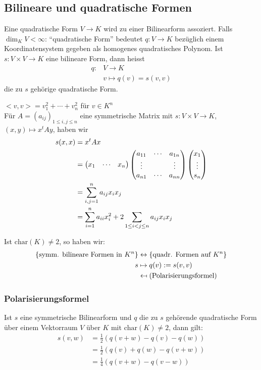 \subsection{Bilineare und quadratische Formen}
Eine quadratische Form $V\to K$ wird zu einer Bilinearform assoziert. Falls $\dim_KV<\infty$: ``quadratische Form'' bedeutet $q:V\to K$ bezüglich einem Koordinatensystem gegeben als homogenes quadratisches Polynom. Ist $s:V\times V\to K$ eine bilineare Form, dann heisst
\begin{align*}
  q:&V\to K\\
  &v \mapsto q(v)=s(v,v)
\end{align*}
die zu $s$ gehörige quadratische Form.
\begin{Bsp}
  $<v,v>=v_1^2+\cdots+v_n^2$ für $v\in K^n$\\
  Für $A=(a_{ij})_{1\leq i, j\leq n}$ eine symmetrische Matrix mit $s:V\times V\to K$, $(x,y)\mapsto x^tAy$, haben wir
  \begin{align*}
    s(x,x)&= x^tAx\\
    &= \begin{pmatrix}x_1&\cdots&x_n\end{pmatrix}\begin{pmatrix}a_{11}&\cdots&a_{1n}\\ \vdots&&\vdots\\ a_{n1}&\cdots&a_{nn}\end{pmatrix}\begin{pmatrix}x_1\\ \vdots \\ s_n\end{pmatrix}\\
    &= \sum^n_{i,j=1}a_{ij}x_ix_j\\
    &= \sum^n_{i=1}a_{ii}x_i^2+2\sum_{1\leq i<j\leq n}a_{ij}x_ix_j
  \end{align*}
\end{Bsp}
Ist $\text{char}(K)\neq 2$, so haben wir:
\begin{align*}
  \{\text{symm. bilineare Formen in $K^n$}\}&\leftrightarrow\{\text{quadr. Formen auf}\ K^n\}\\
  s&\mapsto q(v):=s(v,v)\\
  &\mapsfrom (\text{Polarisierungsformel}) 
\end{align*}
\subsubsection{Polarisierungsformel}
Ist $s$ eine symmetrische Bilinearform und $q$ die zu $s$ gehörende quadratische Form über einem Vektorraum $V$ über $K$ mit $\text{char}(K)\neq 2$, dann gilt: 
\begin{align*}
  s(v,w)&= \frac{1}{2}\left( q(v+w) - q(v) - q(w) \right)\\
  &= \frac{1}{2}\left( q(v)+q(w)-q(v+w) \right)\\
  &= \frac{1}{4}\left( q(v+w)-q(v-w) \right)
\end{align*}
